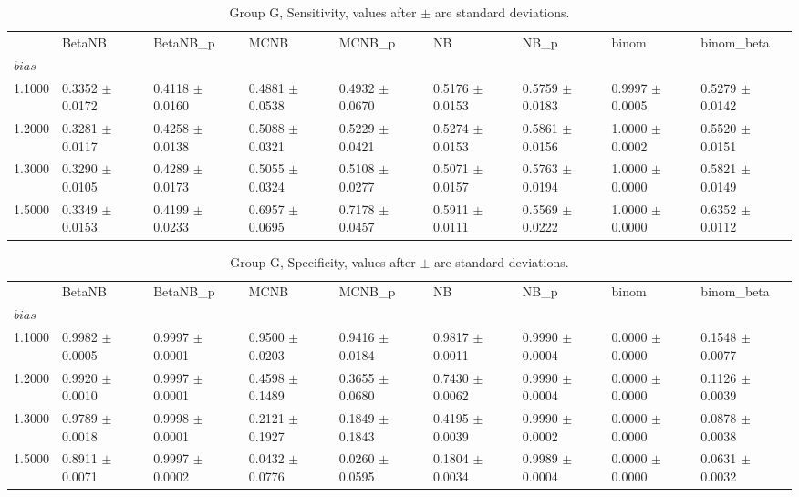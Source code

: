 \begin{table}[H]
\centering
\begin{adjustbox}{max width=\linewidth}
\begin{tabular}{lllllllll}
\toprule
 & BetaNB & BetaNB\_p & MCNB & MCNB\_p & NB & NB\_p & binom & binom\_beta \\
$bias$ &  &  &  &  &  &  &  &  \\
\midrule
1.1000 & 0.3352 $\pm$ 0.0172 & 0.4118 $\pm$ 0.0160 & 0.4881 $\pm$ 0.0538 & 0.4932 $\pm$ 0.0670 & 0.5176 $\pm$ 0.0153 & 0.5759 $\pm$ 0.0183 & 0.9997 $\pm$ 0.0005 & 0.5279 $\pm$ 0.0142 \\
1.2000 & 0.3281 $\pm$ 0.0117 & 0.4258 $\pm$ 0.0138 & 0.5088 $\pm$ 0.0321 & 0.5229 $\pm$ 0.0421 & 0.5274 $\pm$ 0.0153 & 0.5861 $\pm$ 0.0156 & 1.0000 $\pm$ 0.0002 & 0.5520 $\pm$ 0.0151 \\
1.3000 & 0.3290 $\pm$ 0.0105 & 0.4289 $\pm$ 0.0173 & 0.5055 $\pm$ 0.0324 & 0.5108 $\pm$ 0.0277 & 0.5071 $\pm$ 0.0157 & 0.5763 $\pm$ 0.0194 & 1.0000 $\pm$ 0.0000 & 0.5821 $\pm$ 0.0149 \\
1.5000 & 0.3349 $\pm$ 0.0153 & 0.4199 $\pm$ 0.0233 & 0.6957 $\pm$ 0.0695 & 0.7178 $\pm$ 0.0457 & 0.5911 $\pm$ 0.0111 & 0.5569 $\pm$ 0.0222 & 1.0000 $\pm$ 0.0000 & 0.6352 $\pm$ 0.0112 \\
\bottomrule
\end{tabular}

\end{adjustbox}
\caption{Group G, Sensitivity, values after $\pm$ are standard deviations.}
\end{table}

\begin{table}[H]
\centering
\begin{adjustbox}{max width=\linewidth}
\begin{tabular}{lllllllll}
\toprule
 & BetaNB & BetaNB\_p & MCNB & MCNB\_p & NB & NB\_p & binom & binom\_beta \\
$bias$ &  &  &  &  &  &  &  &  \\
\midrule
1.1000 & 0.9982 $\pm$ 0.0005 & 0.9997 $\pm$ 0.0001 & 0.9500 $\pm$ 0.0203 & 0.9416 $\pm$ 0.0184 & 0.9817 $\pm$ 0.0011 & 0.9990 $\pm$ 0.0004 & 0.0000 $\pm$ 0.0000 & 0.1548 $\pm$ 0.0077 \\
1.2000 & 0.9920 $\pm$ 0.0010 & 0.9997 $\pm$ 0.0001 & 0.4598 $\pm$ 0.1489 & 0.3655 $\pm$ 0.0680 & 0.7430 $\pm$ 0.0062 & 0.9990 $\pm$ 0.0004 & 0.0000 $\pm$ 0.0000 & 0.1126 $\pm$ 0.0039 \\
1.3000 & 0.9789 $\pm$ 0.0018 & 0.9998 $\pm$ 0.0001 & 0.2121 $\pm$ 0.1927 & 0.1849 $\pm$ 0.1843 & 0.4195 $\pm$ 0.0039 & 0.9990 $\pm$ 0.0002 & 0.0000 $\pm$ 0.0000 & 0.0878 $\pm$ 0.0038 \\
1.5000 & 0.8911 $\pm$ 0.0071 & 0.9997 $\pm$ 0.0002 & 0.0432 $\pm$ 0.0776 & 0.0260 $\pm$ 0.0595 & 0.1804 $\pm$ 0.0034 & 0.9989 $\pm$ 0.0004 & 0.0000 $\pm$ 0.0000 & 0.0631 $\pm$ 0.0032 \\
\bottomrule
\end{tabular}

\end{adjustbox}
\caption{Group G, Specificity, values after $\pm$ are standard deviations.}
\end{table}

